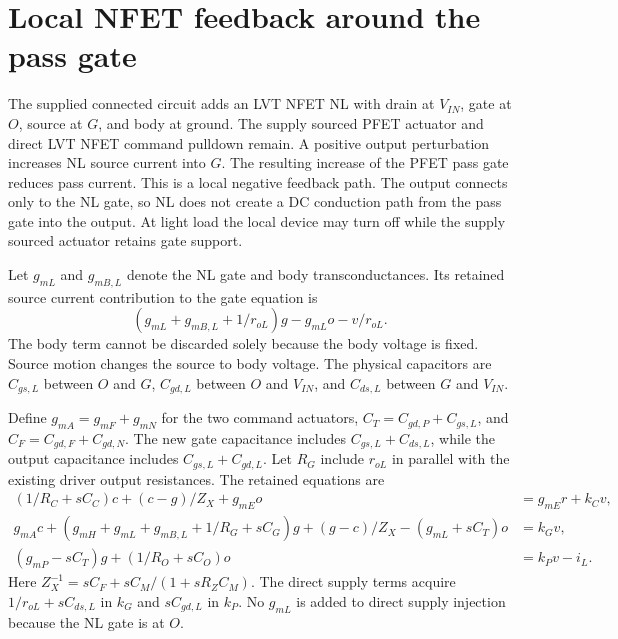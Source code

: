 \section{Local NFET feedback around the pass gate}
The supplied connected circuit adds an LVT NFET NL with drain at $V_{IN}$, gate at $O$, source at $G$, and body at ground. The supply sourced PFET actuator and direct LVT NFET command pulldown remain. A positive output perturbation increases NL source current into $G$. The resulting increase of the PFET pass gate reduces pass current. This is a local negative feedback path. The output connects only to the NL gate, so NL does not create a DC conduction path from the pass gate into the output. At light load the local device may turn off while the supply sourced actuator retains gate support.

Let $g_{mL}$ and $g_{mB,L}$ denote the NL gate and body transconductances. Its retained source current contribution to the gate equation is
\begin{equation}
 (g_{mL}+g_{mB,L}+1/r_{oL})g-g_{mL}o-v/r_{oL}.
\end{equation}
The body term cannot be discarded solely because the body voltage is fixed. Source motion changes the source to body voltage. The physical capacitors are $C_{gs,L}$ between $O$ and $G$, $C_{gd,L}$ between $O$ and $V_{IN}$, and $C_{ds,L}$ between $G$ and $V_{IN}$.

Define $g_{mA}=g_{mF}+g_{mN}$ for the two command actuators, $C_T=C_{gd,P}+C_{gs,L}$, and $C_F=C_{gd,F}+C_{gd,N}$. The new gate capacitance includes $C_{gs,L}+C_{ds,L}$, while the output capacitance includes $C_{gs,L}+C_{gd,L}$. Let $R_G$ include $r_{oL}$ in parallel with the existing driver output resistances. The retained equations are
\begin{align}
 (1/R_C+sC_C)c+(c-g)/Z_X+g_{mE}o&=g_{mE}r+k_Cv,\\
 g_{mA}c+(g_{mH}+g_{mL}+g_{mB,L}+1/R_G+sC_G)g+(g-c)/Z_X
 -(g_{mL}+sC_T)o&=k_Gv,\\
 (g_{mP}-sC_T)g+(1/R_O+sC_O)o&=k_Pv-i_L.
\end{align}
Here $Z_X^{-1}=sC_F+sC_M/(1+sR_ZC_M)$. The direct supply terms acquire $1/r_{oL}+sC_{ds,L}$ in $k_G$ and $sC_{gd,L}$ in $k_P$. No $g_{mL}$ is added to direct supply injection because the NL gate is at $O$.

